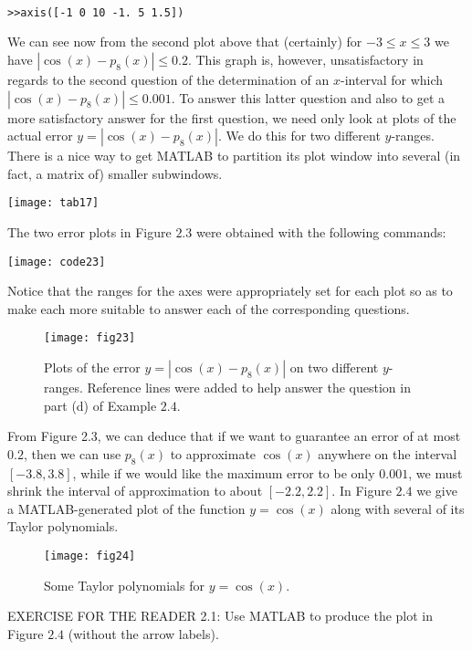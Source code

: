 \documentclass[../main.tex]{subfiles}
\begin{document}
\begin{verbatim}

>>axis([-1 0 10 -1. 5 1.5]) 

\end{verbatim}

We can see now from the second plot above that (certainly) for $-3 \leq x \leq 3$ we have $\left|\cos (x)-p_{8}(x)\right| \leq 0.2$. This graph is, however, unsatisfactory in regards to the second question of the determination of an $x$-interval for which $\left|\cos (x)-p_{8}(x)\right| \leq 0.001$. To answer this latter question and also to get a more satisfactory answer for the first question, we need only look at plots of the actual error $y=\left|\cos (x)-p_{8}(x)\right|$. We do this for two different $y$-ranges. There is a nice way to get MATLAB to partition its plot window into several (in fact, a matrix of) smaller subwindows.

\texttt{[image: tab17]}

The two error plots in Figure $2.3$ were obtained with the following commands:

\texttt{[image: code23]}

Notice that the ranges for the axes were appropriately set for each plot so as to make each more suitable to answer each of the corresponding questions.

\begin{figure}[H]
\centering
\texttt{[image: fig23]}
\caption{ Plots of the error $y=\left|\cos (x)-p_{8}(x)\right|$ on two different $y$-ranges. Reference lines were added to help answer the question in part (d) of Example $2.4$.}
\label{fig:fig_2_3}
\end{figure}

From Figure 2.3, we can deduce that if we want to guarantee an error of at most $0.2$, then we can use $p_{8}(x)$ to approximate $\cos (x)$ anywhere on the interval $[-3.8,3.8]$, while if we would like the maximum error to be only $0.001$, we must shrink the interval of approximation to about $[-2.2,2.2]$. In Figure $2.4$ we give a MATLAB-generated plot of the function $y=\cos (x)$ along with several of its Taylor polynomials.

\begin{figure}[H]
\centering
\texttt{[image: fig24]}
\caption{Some Taylor polynomials for $y=\cos (x)$.}
\label{fig:fig_2_4}
\end{figure}

EXERCISE FOR THE READER 2.1: Use MATLAB to produce the plot in Figure $2.4$ (without the arrow labels).
\end{document}
